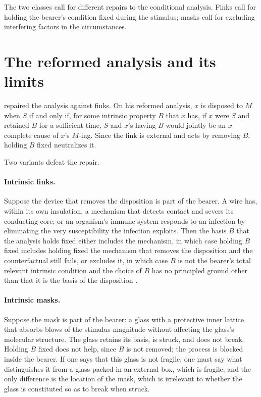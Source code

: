 \documentclass{situationist-preprint}
\begin{document}
The two classes call for different repairs to the conditional analysis. Finks call for holding the bearer's condition fixed during the stimulus; masks call for excluding interfering factors in the circumstances.

\section{The reformed analysis and its limits}

\citet{Lewis1997} repaired the analysis against finks. On his reformed analysis, $x$ is disposed to $M$ when $S$ if and only if, for some intrinsic property $B$ that $x$ has, if $x$ were $S$ and retained $B$ for a sufficient time, $S$ and $x$'s having $B$ would jointly be an $x$-complete cause of $x$'s $M$-ing. Since the fink is external and acts by removing $B$, holding $B$ fixed neutralizes it.

Two variants defeat the repair.

\paragraph{Intrinsic finks.} Suppose the device that removes the disposition is part of the bearer. A wire has, within its own insulation, a mechanism that detects contact and severs its conducting core; or an organism's immune system responds to an infection by eliminating the very susceptibility the infection exploits. Then the basis $B$ that the analysis holds fixed either includes the mechanism, in which case holding $B$ fixed includes holding fixed the mechanism that removes the disposition and the counterfactual still fails, or excludes it, in which case $B$ is not the bearer's total relevant intrinsic condition and the choice of $B$ has no principled ground other than that it is the basis of the disposition \citep{Clarke2008}.

\paragraph{Intrinsic masks.} Suppose the mask is part of the bearer: a glass with a protective inner lattice that absorbs blows of the stimulus magnitude without affecting the glass's molecular structure. The glass retains its basis, is struck, and does not break. Holding $B$ fixed does not help, since $B$ is not removed; the process is blocked inside the bearer. If one says that this glass is not fragile, one must say what distinguishes it from a glass packed in an external box, which is fragile; and the only difference is the location of the mask, which is irrelevant to whether the glass is constituted so as to break when struck.
\end{document}
